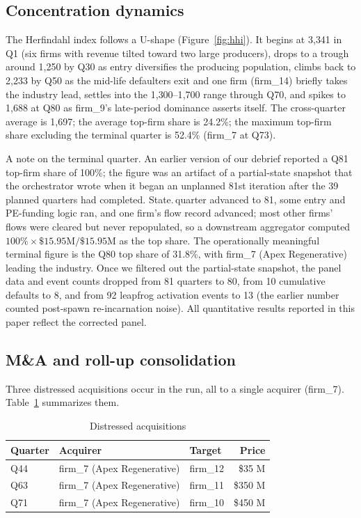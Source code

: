 \documentclass[11pt]{article}
\begin{document}
\subsection{Concentration dynamics}

The Herfindahl index follows a U-shape (Figure~\ref{fig:hhi}). It begins
at 3{,}341 in Q1 (six firms with revenue tilted toward two large
producers), drops to a trough around 1{,}250 by Q30 as entry diversifies
the producing population, climbs back to 2{,}233 by Q50 as the
mid-life defaulters exit and one firm (firm\_14) briefly takes the
industry lead, settles into the 1{,}300--1{,}700 range through Q70, and
spikes to 1{,}688 at Q80 as firm\_9's late-period dominance asserts
itself. The cross-quarter average is 1{,}697; the average top-firm
share is 24.2\%; the maximum top-firm share excluding the terminal
quarter is 52.4\% (firm\_7 at Q73).

A note on the terminal quarter. An earlier version of our debrief
reported a Q81 top-firm share of 100\%; the figure was an artifact of
a partial-state snapshot that the orchestrator wrote when it began an
unplanned 81st iteration after the 39 planned quarters had completed.
State.\,quarter advanced to 81, some entry and PE-funding logic ran,
and one firm's flow record advanced; most other firms' flows were
cleared but never repopulated, so a downstream aggregator computed
$100\% \times \$15.95\text{M} / \$15.95\text{M}$ as the top share. The
operationally meaningful terminal figure is the Q80 top share of
31.8\%, with firm\_7 (Apex Regenerative) leading the industry. Once we
filtered out the partial-state snapshot, the panel data and event
counts dropped from 81 quarters to 80, from 10 cumulative defaults to
8, and from 92 leapfrog activation events to 13 (the earlier number
counted post-spawn re-incarnation noise). All quantitative results
reported in this paper reflect the corrected panel.

\subsection{M\&A and roll-up consolidation}

Three distressed acquisitions occur in the run, all to a single
acquirer (firm\_7). Table~\ref{tab:ma} summarizes them.

\begin{table}[t]\centering\small
\caption{Distressed acquisitions}\label{tab:ma}
\begin{tabular}{lllr}
\toprule
Quarter & Acquirer & Target & Price \\
\midrule
Q44 & firm\_7 (Apex Regenerative) & firm\_12 & \$35 M \\
Q63 & firm\_7 (Apex Regenerative) & firm\_11 & \$350 M \\
Q71 & firm\_7 (Apex Regenerative) & firm\_10 & \$450 M \\
\bottomrule
\end{tabular}
\end{table}
\end{document}
